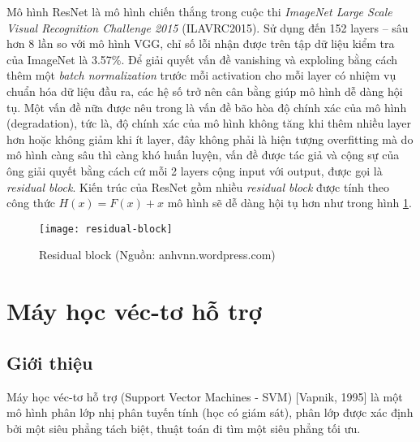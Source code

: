 Mô hình ResNet là mô hình chiến thắng trong cuộc thi \emph{ImageNet Large Scale Visual Recognition Challenge 2015} (ILAVRC2015). Sử dụng đến 152 layers -- sâu hơn 8 lần so với mô hình VGG, chỉ số lỗi nhận được trên tập dữ liệu kiểm tra của ImageNet  là 3.57\%. Để giải quyết vấn đề vanishing và exploling bằng cách thêm một \emph{batch normalization} trước mỗi activation cho mỗi layer có nhiệm vụ chuẩn hóa dữ liệu đầu ra, các hệ số trở nên cân bằng giúp mô hình dễ dàng hội tụ. Một vấn đề nữa được nêu trong \cite{He2015} là vấn đề bão hòa độ chính xác của mô hình (degradation), tức là, độ chính xác của mô hình không tăng khi thêm nhiều layer hơn hoặc không giảm khi ít layer, đây không phải là hiện tượng overfitting mà do mô hình càng sâu thì càng khó huấn luyện, vấn đề được tác giả và cộng sự của ông giải quyết bằng cách cứ mỗi 2 layers cộng input với output, được gọi là \emph{residual block}. Kiến trúc của ResNet gồm nhiều \emph{residual block} được tính theo công thức $H(x) = F(x) + x$ mô hình sẽ dễ dàng hội tụ hơn như trong hình \ref{fig:residual-block}.\par

\begin{figure}[h]
	\centering
	\texttt{[image: residual-block]}
	\caption[Residual block]{Residual block (Nguồn: anhvnn.wordpress.com)}
	\label{fig:residual-block}
\end{figure}


\section{Máy học véc-tơ hỗ trợ}
\subsection{Giới thiệu}
Máy học véc-tơ hỗ trợ (Support Vector Machines - SVM) [Vapnik, 1995] là một mô hình phân lớp nhị phân tuyến tính (học có giám sát), phân lớp được xác định bởi một siêu phẳng tách biệt, thuật toán đi tìm một siêu phẳng tối ưu.\par

